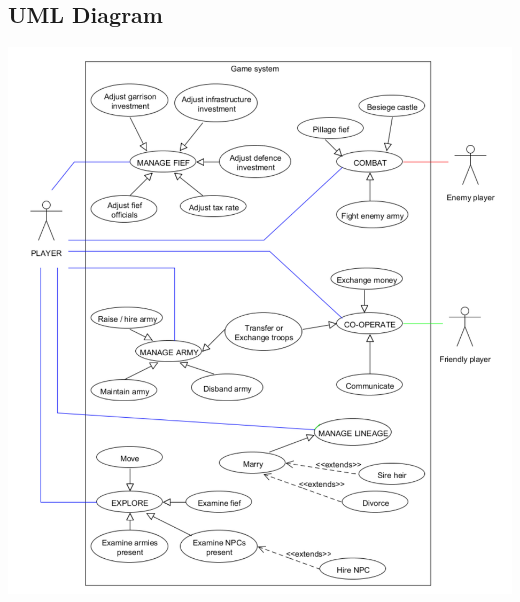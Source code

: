 \documentclass{article}
\begin{document}
	\subsection{UML Diagram}
	\centering
	\includegraphics[width=\textwidth]{gameUML}
\end{document}
